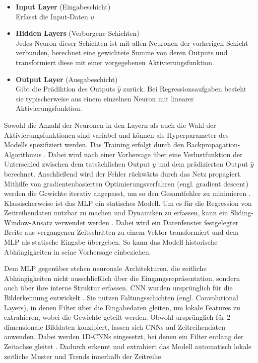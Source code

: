 %
\begin{itemize}
    \item \textbf{Input Layer} (Eingabeschicht) \\ Erfasst die Input-Daten $u$
    \item \textbf{Hidden Layers} (Verborgene Schichten) \\
    Jedes Neuron dieser Schichten ist mit allen Neuronen der vorherigen Schicht verbunden, berechnet eine gewichtete Summe von deren Outputs und transformiert diese mit einer vorgegebenen Aktivierungsfunktion.
    \item \textbf{Output Layer} (Ausgabeschicht) \\
    Gibt die Prädiktion des Outputs $\hat{y}$ zurück. Bei Regressionsaufgaben besteht sie typischerweise aus einem einzelnen Neuron mit linearer Aktivierungsfunktion.
\end{itemize}
%
Sowohl die Anzahl der Neuronen in den Layern als auch die Wahl der Aktivierungsfunktionen sind variabel und können als Hyperparameter des Modells spezifiziert werden. 
Das Training erfolgt durch den Backpropagation-Algorithmus \cite{rumelhart.1986}. Dabei wird nach einer Vorhersage über eine Verlustfunktion der Unterschied zwischen dem tatsächlichen Output $y$ und dem prädizierten Output $\hat{y}$ berechnet. Anschließend wird der Fehler rückwärts durch das Netz propagiert. Mithilfe von gradientenbasierten Optimierungsverfahren (engl. gradient descent) werden die Gewichte iterativ angepasst, um so den Gesamtfehler zu minimieren \cite{goodfellow.2016}.
Klassischerweise ist das \ac{MLP} ein statisches Modell. Um es für die Regression von Zeitreihendaten nutzbar zu machen und Dynamiken zu erfassen, kann ein Sliding-Window-Ansatz verwendet werden \cite{bontempi.2012}. Dabei wird ein Datenfenster festgelegter Breite aus vergangenen Zeitschritten zu einem Vektor transformiert und dem \ac{MLP} als statische Eingabe übergeben. So kann das Modell historische Abhängigkeiten in seine Vorhersage einbeziehen. \par
Dem \ac{MLP} gegenüber stehen neuronale Architekturen, die zeitliche Abhängigkeiten nicht ausschließlich über die Eingangsrepräsentation, sondern auch über ihre interne Struktur erfassen.
\ac{CNN} wurden ursprünglich für die Bilderkennung entwickelt \cite{lecun.2002}. Sie nutzen Faltungsschichten (engl. Convolutional Layers), in denen Filter über die Eingabedaten gleiten, um lokale Features zu extrahieren, wobei die Gewichte geteilt werden.
Obwohl ursprünglich für 2-dimensionale Bilddaten konzipiert, lassen sich \ac{CNN}s auf Zeitreihendaten anwenden. Dabei werden 1D-\ac{CNN}s eingesetzt, bei denen ein Filter entlang der Zeitachse gleitet \cite{kiranyaz.2021}. Dadurch erkennt und extrahiert das Modell automatisch lokale zeitliche Muster und Trends innerhalb der Zeitreihe. \par
